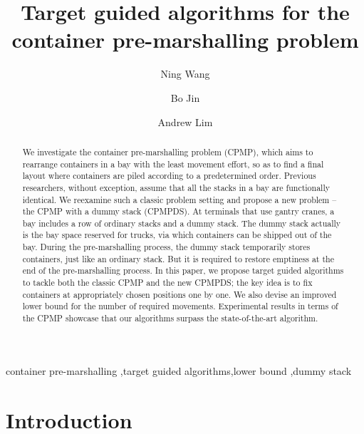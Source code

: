 \documentclass[review,3p,times,authoryear,12pt]{elsarticle}
\begin{document}
\graphicspath{{./figure/}}
\begin{frontmatter}
\newpage

\title{Target guided algorithms for the container pre-marshalling problem}

\author{Ning Wang}

\author{Bo Jin}

\author{Andrew Lim}

\address{
Department of Management Sciences, City University of Hong Kong, 83 Tat Chee Ave, Kowloon Tong, Hong Kong
}

\begin{abstract}
We investigate the container pre-marshalling problem (CPMP), which aims to rearrange containers in a bay with the least movement effort, so as to find a final layout where containers are piled according to a predetermined order. Previous researchers, without exception, assume that all the stacks in a bay are functionally identical. We reexamine such a classic problem setting and propose a new problem -- the CPMP with a dummy stack (CPMPDS).
At terminals that use gantry cranes, a bay includes a row of ordinary stacks and a dummy stack. The dummy stack actually is the bay space reserved for trucks, via which containers can be shipped out of the bay. During the pre-marshalling process, the dummy stack temporarily stores containers, just like an ordinary stack.
But it is required to restore emptiness at the end of the pre-marshalling process. In this paper, we propose target guided algorithms to tackle both the classic CPMP and the new CPMPDS; the key idea is to fix containers at appropriately chosen positions one by one. We also devise an improved lower bound for the number of required movements. Experimental results in terms of the CPMP showcase that our algorithms surpass the state-of-the-art algorithm.
\end{abstract}

\begin{keyword}
container pre-marshalling \sep target guided algorithms\sep lower bound \sep dummy stack
\end{keyword}
\end{frontmatter}

\section{Introduction}
\end{document}
